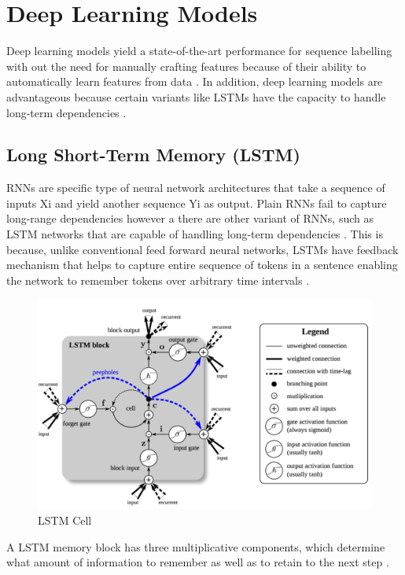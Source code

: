 \section{Deep Learning Models }
\label{sec:chapter05:MLModels:DLMs}

Deep learning models yield a state-of-the-art performance for sequence labelling with out the need for manually crafting features because of their ability to automatically learn features from data \citep{he2020survey}. In addition, deep learning models are advantageous because certain variants like \ac{LSTM}s have the capacity to handle long-term dependencies \citep{akhundov2018sequence}. 



\subsection{Long Short-Term Memory (\ac{LSTM})}
\label{sec:chapter05:DLModels:LSTM}

\ac{RNN}s are specific type of neural network architectures that take a sequence of inputs Xi and yield another sequence Yi as output. Plain RNNs fail to capture long-range dependencies however a there are other variant of RNNs, such as LSTM networks that are capable of handling long-term dependencies \citep{akhundov2018sequence, lample2016neural}. This is because, unlike conventional feed forward neural networks, LSTMs have feedback mechanism that helps to capture entire sequence of tokens in a sentence enabling the network to remember tokens over arbitrary time intervals \citep{hochreiter1997long}. \\

\begin{figure}[htbp]
	\centering
	\includegraphics[width=.65\textwidth]{4.graphics/figures/ch_5/pdf/LSTM_cell}
	\caption{\ac{LSTM} Cell \citep{ma2016end}}
	\label{fig:chapter03:setup}
\end{figure}

A \ac{LSTM} memory block has three multiplicative components, which determine what amount of information to remember as well as to retain to the next step \citep{ma2016end}. 



